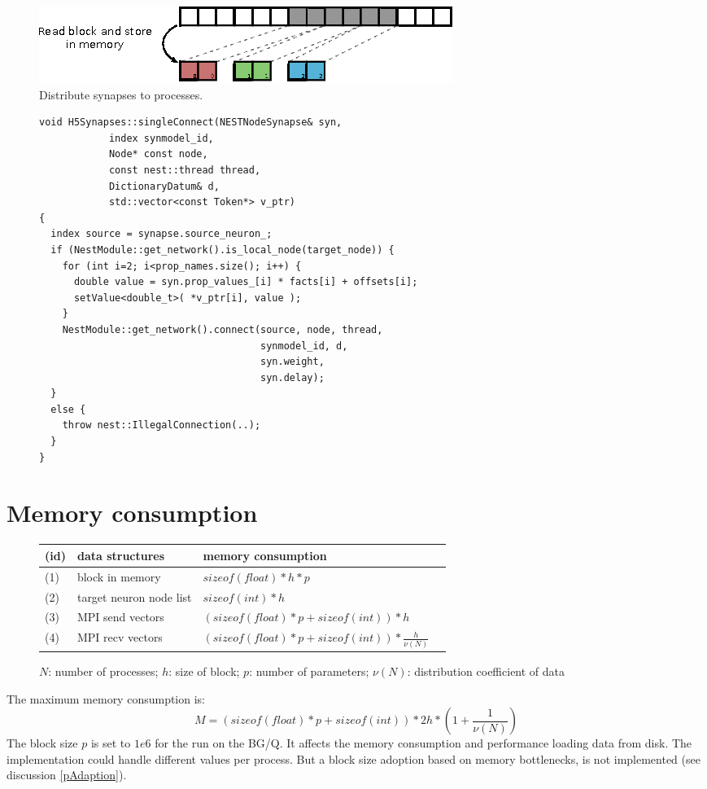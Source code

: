 \begin{figure}[ht!]
\centering
\includegraphics[scale=2.0]{pictures/import_syn_vis_second_it.eps}
\caption{Distribute synapses to processes.}
\end{figure}

\begin{figure}[ht!]
\begin{lstlisting}[style=cppcode]
void H5Synapses::singleConnect(NESTNodeSynapse& syn, 
    		index synmodel_id,
    		Node* const node,
    		const nest::thread thread,
    		DictionaryDatum& d, 
    		std::vector<const Token*> v_ptr)
{
  index source = synapse.source_neuron_;
  if (NestModule::get_network().is_local_node(target_node)) { 
    for (int i=2; i<prop_names.size(); i++) {
      double value = syn.prop_values_[i] * facts[i] + offsets[i];
      setValue<double_t>( *v_ptr[i], value );
    }
    NestModule::get_network().connect(source, node, thread,
                                      synmodel_id, d,
                                      syn.weight,
                                      syn.delay);
  }
  else {
    throw nest::IllegalConnection(..);
  }
}
\end{lstlisting}
\caption{}
\end{figure}

\newpage
\section{Memory consumption}
\begin{figure}[ht!]
\begin{tabular}{| l | l | l | l |}
    \hline
    (id) & data structures & memory consumption \\ \hline
    (1) & block in memory & $sizeof(float)*h*p$ \\ \hline
    (2) & target neuron node list & $sizeof(int)*h$ \\ \hline
    (3) & MPI send vectors & $(sizeof(float)*p + sizeof(int)) * h$ \\ \hline
    (4) & MPI recv vectors & $(sizeof(float)*p + sizeof(int)) * \frac{h}{\nu(N)}$ \\ \hline
    \end{tabular}
\caption{$N$: number of processes; $h$: size of block; $p$: number of parameters; $\nu(N)$: distribution coefficient of data}
\end{figure}
The maximum memory consumption is:
\begin{equation}
  M = (sizeof(float)*p + sizeof(int)) * 2h * (1 + \frac{1}{\nu(N)})
  \label{eq:maxmemoryconsumption}
\end{equation}
The block size $p$ is set to $1e6$ for the run on the BG/Q.
It affects the memory consumption and performance loading data from disk.
The implementation could handle different values per process.
But a block size adoption based on memory bottlenecks, is not implemented (see discussion \ref{pAdaption}).